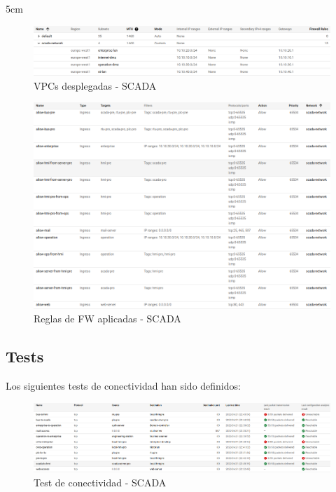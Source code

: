   \hfill{5cm}

  \begin{figure}[h]
  \centering
  \includegraphics[width=\textwidth]{../imgs/desarrollo/resultados/scada/vpcs.png}
  \caption{VPCs desplegadas - SCADA}
  \end{figure}
  \clearpage

  \begin{figure}[t]
  \centering
  \includegraphics[width=\textwidth]{../imgs/desarrollo/resultados/scada/fws.png}
  \caption{Reglas de FW aplicadas - SCADA}
  \end{figure}
  
\subsection{Tests}
  Los siguientes tests de conectividad han sido definidos:

  \begin{figure}[h]
  \centering
  \includegraphics[width=\textwidth]{../imgs/desarrollo/resultados/scada/tests.png}
  \caption{Test de conectividad - SCADA}
  \end{figure}
  \clearpage

